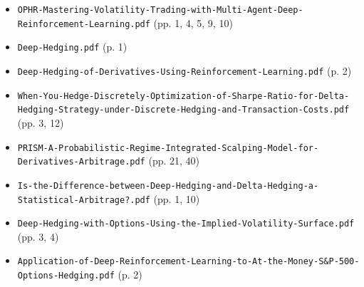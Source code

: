 \documentclass{article}
\begin{document}
\begin{itemize}

\item \texttt{OPHR-\allowbreak{}Mastering-\allowbreak{}Volatility-\allowbreak{}Trading-\allowbreak{}with-\allowbreak{}Multi-\allowbreak{}Agent-\allowbreak{}Deep-\allowbreak{}Reinforcement-\allowbreak{}Learning.\allowbreak{}pdf} (pp. 1, 4, 5, 9, 10)

\item \texttt{Deep-\allowbreak{}Hedging.\allowbreak{}pdf} (p. 1)

\item \texttt{Deep-\allowbreak{}Hedging-\allowbreak{}of-\allowbreak{}Derivatives-\allowbreak{}Using-\allowbreak{}Reinforcement-\allowbreak{}Learning.\allowbreak{}pdf} (p. 2)

\item \texttt{When-\allowbreak{}You-\allowbreak{}Hedge-\allowbreak{}Discretely-\allowbreak{}Optimization-\allowbreak{}of-\allowbreak{}Sharpe-\allowbreak{}Ratio-\allowbreak{}for-\allowbreak{}Delta-\allowbreak{}Hedging-\allowbreak{}Strategy-\allowbreak{}under-\allowbreak{}Discrete-\allowbreak{}Hedging-\allowbreak{}and-\allowbreak{}Transaction-\allowbreak{}Costs.\allowbreak{}pdf} (pp. 3, 12)

\item \texttt{PRISM-\allowbreak{}A-\allowbreak{}Probabilistic-\allowbreak{}Regime-\allowbreak{}Integrated-\allowbreak{}Scalping-\allowbreak{}Model-\allowbreak{}for-\allowbreak{}Derivatives-\allowbreak{}Arbitrage.\allowbreak{}pdf} (pp. 21, 40)

\item \texttt{Is-\allowbreak{}the-\allowbreak{}Difference-\allowbreak{}between-\allowbreak{}Deep-\allowbreak{}Hedging-\allowbreak{}and-\allowbreak{}Delta-\allowbreak{}Hedging-\allowbreak{}a-\allowbreak{}Statistical-\allowbreak{}Arbitrage?.\allowbreak{}pdf} (pp. 1, 10)

\item \texttt{Deep-\allowbreak{}Hedging-\allowbreak{}with-\allowbreak{}Options-\allowbreak{}Using-\allowbreak{}the-\allowbreak{}Implied-\allowbreak{}Volatility-\allowbreak{}Surface.\allowbreak{}pdf} (pp. 3, 4)

\item \texttt{Application-\allowbreak{}of-\allowbreak{}Deep-\allowbreak{}Reinforcement-\allowbreak{}Learning-\allowbreak{}to-\allowbreak{}At-\allowbreak{}the-\allowbreak{}Money-\allowbreak{}S\&P-\allowbreak{}500-\allowbreak{}Options-\allowbreak{}Hedging.\allowbreak{}pdf} (p. 2)


\end{itemize}
\end{document}
